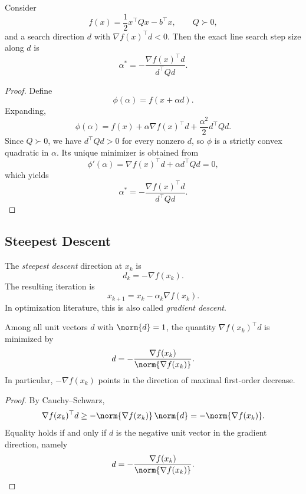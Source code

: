 \begin{proposition}\label{prop:l2-exact-line-search-for-convex-quadratics}
	Consider
	\[
		f(x)=\frac{1}{2}x^\top Qx-b^\top x,
		\qquad Q \succ 0,
	\]
	and a search direction $d$ with $\nabla f(x)^\top d<0$. Then the exact line search step size along $d$ is
	\[
		\alpha^\ast = -\frac{\nabla f(x)^\top d}{d^\top Qd}.
	\]
\end{proposition}
\begin{proof}
	Define
	\[
		\phi(\alpha)=f(x+\alpha d).
	\]
	Expanding,
	\[
		\phi(\alpha)=f(x)+\alpha \nabla f(x)^\top d+\frac{\alpha^2}{2}d^\top Qd.
	\]
	Since $Q\succ 0$, we have $d^\top Qd>0$ for every nonzero $d$, so $\phi$ is a strictly convex quadratic in $\alpha$. Its unique minimizer is obtained from
	\[
		\phi'(\alpha)=\nabla f(x)^\top d+\alpha d^\top Qd=0,
	\]
	which yields
	\[
		\alpha^\ast = -\frac{\nabla f(x)^\top d}{d^\top Qd}.
	\]
\end{proof}

\subsection{Steepest Descent}
\label{sec:l2-steepest-descent}

\begin{definition}\label{def:l2-steepest-descent-iteration}
	The \emph{steepest descent} direction at $x_k$ is
	\[
		d_k=-\nabla f(x_k).
	\]
	The resulting iteration is
	\[
		x_{k+1}=x_k-\alpha_k \nabla f(x_k).
	\]
	In optimization literature, this is also called \emph{gradient descent}.
\end{definition}

\begin{proposition}\label{prop:l2-why-the-negative-gradient-is-the-steepest-descent-direction}
	Among all unit vectors $d$ with $\norm{d}=1$, the quantity $\nabla f(x_k)^\top d$ is minimized by
	\[
		d = -\frac{\nabla f(x_k)}{\norm{\nabla f(x_k)}}.
	\]
	In particular, $-\nabla f(x_k)$ points in the direction of maximal first-order decrease.
\end{proposition}
\begin{proof}
	By Cauchy--Schwarz,
	\[
		\nabla f(x_k)^\top d
		\ge -\norm{\nabla f(x_k)}\,\norm{d}
		= -\norm{\nabla f(x_k)}.
	\]
	Equality holds if and only if $d$ is the negative unit vector in the gradient direction, namely
	\[
		d = -\frac{\nabla f(x_k)}{\norm{\nabla f(x_k)}}.
	\]
\end{proof}

